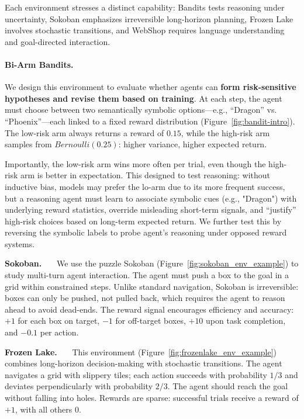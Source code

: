 Each environment stresses a distinct capability: Bandits tests reasoning under uncertainty, Sokoban emphasizes irreversible long-horizon planning, Frozen Lake involves stochastic transitions, and WebShop requires language understanding and goal-directed interaction.

\paragraph{Bi-Arm Bandits.}
We design this environment to evaluate whether agents can \textbf{form risk-sensitive hypotheses and revise them based on training}. At each step, the agent must choose between two semantically symbolic options—e.g., “Dragon” vs. “Phoenix”—each linked to a fixed reward distribution (Figure~\ref{fig:bandit-intro}). The low-risk arm always returns a reward of $0.15$, while the high-risk arm samples from $Bernoulli(0.25)$: higher variance, higher expected return. 

Importantly, the low-risk arm wins more often per trial, even though the high-risk arm is better in expectation. This designed to test reasoning: without inductive bias, models may prefer the lo-arm due to its more frequent success, but a reasoning agent must learn to associate symbolic cues (e.g., "Dragon") with underlying reward statistics, override misleading short-term signals, and “justify” high-risk choices based on long-term expected return. We further test this by reversing the symbolic labels to probe agent’s reasoning under opposed reward systems.

\noindent\textbf{Sokoban.}~~~
We use the puzzle Sokoban (Figure~\ref{fig:sokoban_env_example}) to study multi-turn agent interaction. The agent must push a box to the goal in a grid within constrained steps. Unlike standard navigation, Sokoban is irreversible: boxes can only be pushed, not pulled back, which requires the agent to reason ahead to avoid dead-ends. The reward signal encourages efficiency and accuracy: $+1$ for each box on target, $-1$ for off-target boxes, $+10$ upon task completion, and $-0.1$ per action.

\noindent\textbf{Frozen Lake.}~~~
This environment (Figure~\ref{fig:frozenlake_env_example}) combines long-horizon decision-making with stochastic transitions. The agent navigates a grid with slippery tiles; each action succeeds with probability $1/3$ and deviates perpendicularly with probability $2/3$. The agent should reach the goal without falling into holes. Rewards are sparse: successful trials receive a reward of $+1$, with all others $0$. 

